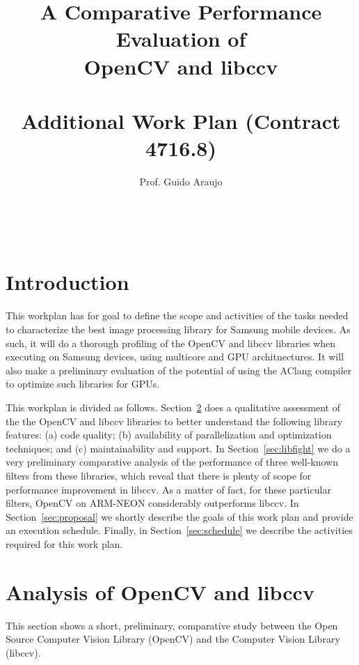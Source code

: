 \documentclass[12pt, fleqn]{article}
\newcommand{\rsec}[1]{Section~\ref{sec:#1}}
\begin{document}
\title{A Comparative Performance Evaluation of \\ OpenCV and libccv \\\  \\
{\large Additional Work Plan (Contract 4716.8)\\}}
\author{Prof. Guido Araujo\\ \ \\ \ \\ \  \\}
\date{\vspace{-9ex}}
\maketitle

\section{Introduction} 
\label{sec:Introduction}

This workplan has for goal to define the scope and activities of the tasks  needed  to characterize the best image processing  library for  Samsung mobile devices.  As such, it will do a thorough profiling of the OpenCV and libccv libraries when executing  on Samsung devices, using multicore and GPU architnectures. It will also make a preliminary evaluation of the potential of using the  AClang compiler to optimize such libraries for GPUs.

This workplan is divided  as follows. \rsec{libs} does a qualitative assessment of the the OpenCV and libccv libraries to better understand the following library features: (a)  code quality; (b) availability of parallelization and optimization techniques; and (c) maintainability and support. In \rsec{libfight} we do a very preliminary comparative analysis of the performance of three well-known filters from these libraries, which reveal that there is plenty of scope for performance improvement in libccv. As a matter of fact, for these particular filters, OpenCV on ARM-NEON considerably outperforms libccv. In \rsec{proposal} we shortly describe the goals of this work plan and provide an execution schedule. Finally, in  \rsec{schedule} we describe the activities required for this work plan.

\section{Analysis of OpenCV and libccv}
\label{sec:libs}

This section shows a short, preliminary, comparative study between the Open Source Computer Vision Library (OpenCV)\cite{opencv} and the Computer Vision Library (libccv)\cite{ccv}. 
\end{document}
